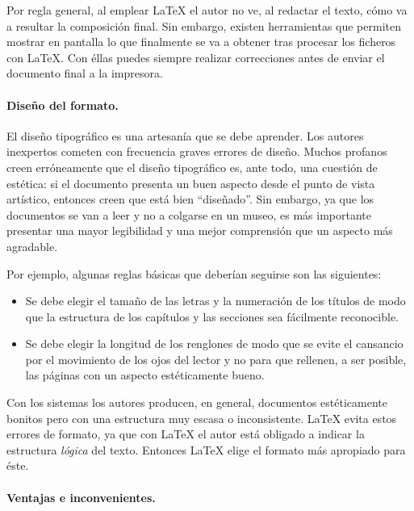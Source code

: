 Por regla general, al emplear \LaTeX{}  el autor no ve, al redactar el
texto, cómo va  a resultar la composición final.  Sin embargo, existen
herramientas que permiten mostrar en  pantalla lo que finalmente se va
a  obtener tras  procesar los  ficheros con  \LaTeX. Con  éllas puedes
siempre realizar correcciones antes de  enviar el documento final a la
impresora.

\paragraph{Diseño del formato.}

El  diseño tipográfico  es una  artesanía  que se  debe aprender.  Los
autores inexpertos  cometen con  frecuencia graves errores  de diseño.
Muchos profanos creen erróneamente que  el diseño tipográfico es, ante
todo,  una cuestión  de estética:  si  el documento  presenta un  buen
aspecto desde  el punto  de vista artístico,  entonces creen  que está
bien ``diseñado''. Sin embargo, ya que  los documentos se van a leer y
no  a colgarse  en un  museo, es  más importante  presentar una  mayor
legibilidad y una mejor comprensión que un aspecto más agradable.

Por  ejemplo, algunas  reglas básicas  que deberían  seguirse son  las
siguientes:

\begin{itemize}

\item Se debe  elegir el tamaño de  las letras y la  numeración de los
títulos de modo que la estructura de los capítulos y las secciones sea
fácilmente reconocible.

\item Se debe elegir la longitud de los renglones de modo que se evite
el cansancio por  el movimiento de los  ojos del lector y  no para que
rellenen,  a ser  posible, las  páginas con  un aspecto  estéticamente
bueno.

\end{itemize}

Con  los  sistemas    los autores  producen,  en  general,
documentos estéticamente bonitos pero con  una estructura muy escasa o
inconsistente. \LaTeX{}  evita estos  errores de  formato, ya  que con
\LaTeX{} el autor está obligado  a indicar la estructura \emph{lógica}
del texto. Entonces \LaTeX{} elige el formato más apropiado para éste.

\paragraph{Ventajas e inconvenientes.}

